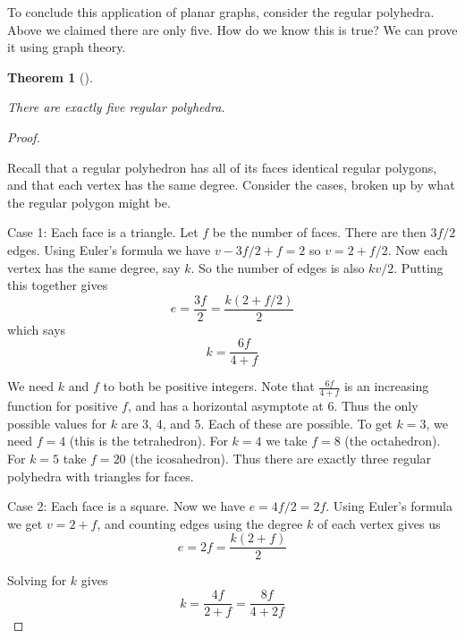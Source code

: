 \documentclass[10pt,]{book}
\theoremstyle{plain}
\newtheorem{theorem}{Theorem}[section]
\theoremstyle{definition}
\theoremstyle{definition}
\theoremstyle{definition}
\numberwithin{equation}{chapter}
\begin{document}
To conclude this application of planar graphs, consider the regular polyhedra. Above we claimed there are only five. How do we know this is true? We can prove it using graph theory.
%
\begin{theorem}[]\label{theorem-4}

There are exactly five regular polyhedra.
%
\end{theorem}
\begin{proof}\hypertarget{proof-57}{}

Recall that a regular polyhedron has all of its faces identical regular polygons, and that each vertex has the same degree. Consider the cases, broken up by what the regular polygon might be.
%
\par

Case 1: Each face is a triangle. Let \(f\) be the number of faces. There are then \(3f/2\) edges. Using Euler's formula we have \(v - 3f/2 + f = 2\) so \(v = 2 + f/2\). Now each vertex has the same degree, say \(k\). So the number of edges is also \(kv/2\). Putting this together gives
\begin{equation*}
  e = \frac{3f}{2} = \frac{k(2+f/2)}{2}
\end{equation*}
which says
\begin{equation*}
  k = \frac{6f}{4+f}
\end{equation*}
%
\par

We need \(k\) and \(f\) to both be positive integers. Note that \(\frac{6f}{4+f}\) is an increasing function for positive \(f\), and has a horizontal asymptote at 6. Thus the only possible values for \(k\) are 3, 4, and 5. Each of these are possible. To get \(k = 3\), we need \(f = 4\) (this is the tetrahedron). For \(k = 4\) we take \(f = 8\) (the octahedron). For \(k = 5\) take \(f = 20\) (the icosahedron). Thus there are exactly three regular polyhedra with triangles for faces.
%
\par

Case 2: Each face is a square. Now we have \(e = 4f/2 = 2f\). Using Euler's formula we get \(v = 2 + f\), and counting edges using the degree \(k\) of each vertex gives us
\begin{equation*}
  e = 2f = \frac{k(2+f)}{2}
\end{equation*}
%
\par

Solving for \(k\) gives
\begin{equation*}
  k = \frac{4f}{2+f} = \frac{8f}{4+2f}
\end{equation*}
%
\par


\end{proof}
\end{document}
